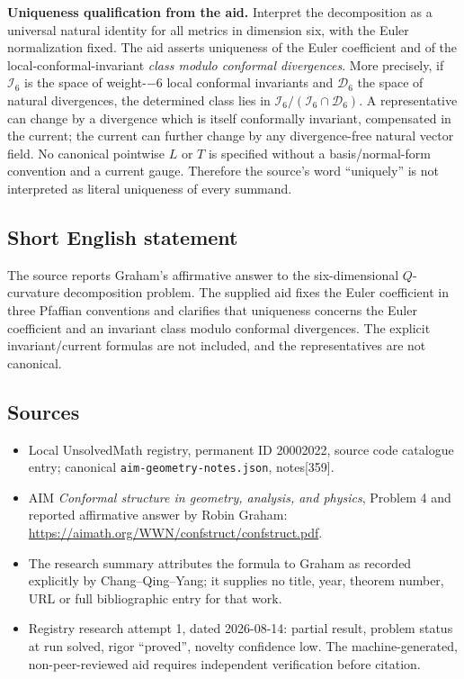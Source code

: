 \documentclass[11pt]{article}
\begin{document}
\textbf{Uniqueness qualification from the aid.} Interpret the decomposition as a universal natural identity for all metrics in dimension six, with the Euler normalization fixed. The aid asserts uniqueness of the Euler coefficient and of the local-conformal-invariant \emph{class modulo conformal divergences}. More precisely, if $\mathcal I_6$ is the space of weight-$-6$ local conformal invariants and $\mathcal D_6$ the space of natural divergences, the determined class lies in $\mathcal I_6/(\mathcal I_6\cap\mathcal D_6)$. A representative can change by a divergence which is itself conformally invariant, compensated in the current; the current can further change by any divergence-free natural vector field. No canonical pointwise $L$ or $T$ is specified without a basis/normal-form convention and a current gauge. Therefore the source's word ``uniquely'' is not interpreted as literal uniqueness of every summand.
\subsection{Short English statement}
The source reports Graham's affirmative answer to the six-dimensional $Q$-curvature decomposition problem. The supplied aid fixes the Euler coefficient in three Pfaffian conventions and clarifies that uniqueness concerns the Euler coefficient and an invariant class modulo conformal divergences. The explicit invariant/current formulas are not included, and the representatives are not canonical.
\subsection{Sources}
\begin{itemize}
\item Local UnsolvedMath registry, permanent ID 20002022, source code catalogue entry; canonical \texttt{aim-geometry-notes.json}, notes[359].
\item AIM \emph{Conformal structure in geometry, analysis, and physics}, Problem 4 and reported affirmative answer by Robin Graham: \url{https://aimath.org/WWN/confstruct/confstruct.pdf}.
\item The research summary attributes the formula to Graham as recorded explicitly by Chang--Qing--Yang; it supplies no title, year, theorem number, URL or full bibliographic entry for that work.
\item Registry research attempt 1, dated 2026-08-14: partial result, problem status at run solved, rigor ``proved'', novelty confidence low. The machine-generated, non-peer-reviewed aid requires independent verification before citation.
\end{itemize}
\end{document}
